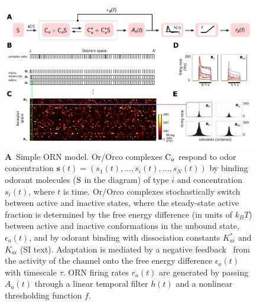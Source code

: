 \documentclass[10pt,prl,aps,showpacs,twocolumn,unsortedaddress]{revtex4-1}
\begin{document}
\begin{figure}[!tb]
	\centering
	\begin{subfigure}[t]{\linewidth}
		\label{fig:tuning_curves_a}
	\end{subfigure}
	\begin{subfigure}[t]{0\linewidth}
		\label{fig:tuning_curves_b}
	\end{subfigure}
	\begin{subfigure}[t]{0\linewidth}
		\label{fig:tuning_curves_c}
	\end{subfigure}
	\begin{subfigure}[t]{0\linewidth}
		\label{fig:tuning_curves_d}
	\end{subfigure}
	\begin{subfigure}[t]{0\linewidth}
		\label{fig:tuning_curves_e}
	\end{subfigure}
	\includegraphics[width=\linewidth]{figures/1_tuning_curves}
	\caption{\footnotesize{
		\textbf{A}~Simple ORN model. Or/Orco complexes $\textup{C}_a$ respond to odor concentration $\mathbf{s}(t)=(s_1(t),...,s_i(t),...,s_N(t))$ by binding odorant molecules ($\textup{S}$ in the diagram) of type $i$ and concentration $s_i(t)$, where $t$ is time. Or/Orco complexes stochastically switch between active and inactive states, where the steady-state active fraction is determined by the free energy difference (in units of $k_B T$) between active and inactive conformations in the unbound state, $\epsilon_a(t)$, and by odorant binding with dissociation constants $K^*_{ai}$ and $K_{ai}$ (SI text). Adaptation is mediated by a negative feedback~\cite{nagel_wilson_biophysical} from the activity of the channel onto the free energy difference $\epsilon_a(t)$ with timescale $\tau$. ORN firing rates $r_a(t)$ are generated by passing $A_a(t)$ through a linear temporal filter $h(t)$ and a nonlinear thresholding function $f$. 
}}
\end{figure}
\end{document}
